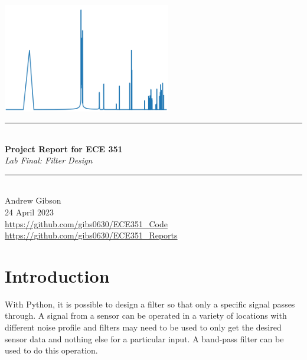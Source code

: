 \documentclass[12pt,a4paper]{article}
\newcommand{\HRule}{\rule{\linewidth}{0.5mm}}
\begin{document}
\begin{titlepage}
\begin{center}
\includegraphics[width=0.55\textwidth]{titlepage_image.png}~\\[2cm]
\HRule \\[0.4cm]
{ \LARGE 
  \textbf{Project Report for ECE 351}\\[0.4cm]
  \emph{Lab Final: Filter Design}\\[0.4cm]
}
\HRule \\[1.5cm]
{ \large
  Andrew Gibson \\[0.1cm]
 24 April 2023\\[0.1cm]
  \url{https://github.com/gibs0630/ECE351\_Code}\\[0.1cm]
  \url{https://github.com/gibs0630/ECE351\_Reports}\\[0.1cm]
}
\vfill
{\large }
 
\end{center}
\end{titlepage}
\newpage
\tableofcontents
{}
\newpage
\setcounter{page}{1}
\section{Introduction}\label{sec:intro}
With Python, it is possible to design a filter so that only a specific signal passes through.  A signal from a sensor can be operated in a variety of locations with different noise profile and filters may need to be used to only get the desired sensor data and nothing else for a particular input.  A band-pass filter can be used to do this operation.
\end{document}
